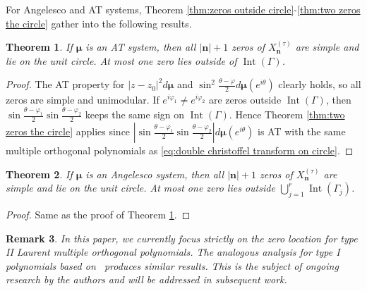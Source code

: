 \documentclass[reqno,centertags,11pt,draft]{amsart}
\newtheorem{thm}{Theorem}[section]
\newtheorem{cor}[thm]{Corollary}
\newtheorem{rem}[thm]{Remark}
\newcommand{\D}{\mathbb{D}}
\renewcommand{\d}{\partial}
\newcommand{\abs}[1]{\left|#1\right|}
\begin{document}

For Angelesco and AT systems, Theorem \ref{thm:zeros outside circle}-\ref{thm:two zeros the circle} gather into the following results. 

\begin{thm}\label{thm:at zeros}
    If $\bm{\mu}$ is an AT system, then all $|\bm{n}|+1$ zeros of $X_{\bm{n}}^{(\tau)}$ are simple and lie on the unit circle. At most one zero lies outside of $\operatorname{Int}(\Gamma)$.
\end{thm}
\begin{proof}
    The AT property for $\abs{z-z_0}^2d\bm{\mu}$ and $\sin^2\frac{\theta-\varphi}{2}d\bm{\mu}(e^{i\theta})$ clearly holds, so all zeros are simple and unimodular. If $e^{i\varphi_1} \neq e^{i\varphi_2}$ are zeros outside $\operatorname{Int}(\Gamma)$, then $\sin\frac{\theta-\varphi_1}{2}\sin\frac{\theta-\varphi_2}{2}$ keeps the same sign on $\operatorname{Int}(\Gamma)$. Hence Theorem \ref{thm:two zeros the circle} applies since $\abs{\sin\frac{\theta-\varphi_1}{2}\sin\frac{\theta-\varphi_2}{2}}d\bm{\mu}(e^{i\theta})$ is AT with the same multiple orthogonal polynomials as \eqref{eq:double christoffel transform on circle}. 
\end{proof}

\begin{thm}\label{thm:angelesco zeros}
    If $\bm{\mu}$ is an Angelesco system, then all $|\bm{n}|+1$ zeros of $X_{\bm{n}}^{(\tau)}$ are simple and lie on the unit circle. At most one zero lies  outside $\bigcup_{j = 1}^r\operatorname{Int}(\Gamma_j)$.
\end{thm}

\begin{proof}
    Same as the proof of Theorem \ref{thm:at zeros}.
\end{proof}

\begin{rem}
    In this paper, we currently focus strictly on the zero location for type II Laurent multiple orthogonal polynomials. The analogous analysis for type I polynomials based on~\cite{KVNikInt} produces similar results. This is the subject of ongoing research by the authors and will be addressed in subsequent work.
\end{rem}
\end{document}
